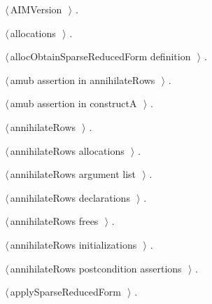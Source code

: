 \documentclass{article}
\begin{document}
{\small\begin{list}{}{\setlength{\itemsep}{-\parsep}\setlength{\itemindent}{-\leftmargin}}
\item $\langle\,$AIMVersion\nobreak\ {\footnotesize {}}$\,\rangle$ {\footnotesize {\NWtxtRefIn} .}
\item $\langle\,$allocations\nobreak\ {\footnotesize {}}$\,\rangle$ {\footnotesize {\NWtxtRefIn} .
}
\item $\langle\,$allocObtainSparseReducedForm definition\nobreak\ {\footnotesize {}}$\,\rangle$ {\footnotesize {\NWtxtRefIn} .}
\item $\langle\,$amub assertion in annihilateRows\nobreak\ {\footnotesize {}}$\,\rangle$ {\footnotesize {\NWtxtRefIn} .}
\item $\langle\,$amub assertion in constructA\nobreak\ {\footnotesize {}}$\,\rangle$ {\footnotesize {\NWtxtRefIn} .}
\item $\langle\,$annihilateRows\nobreak\ {\footnotesize {}}$\,\rangle$ {\footnotesize {\NWtxtRefIn} .}
\item $\langle\,$annihilateRows allocations\nobreak\ {\footnotesize {}}$\,\rangle$ {\footnotesize {\NWtxtRefIn} .}
\item $\langle\,$annihilateRows argument list\nobreak\ {\footnotesize {}}$\,\rangle$ {\footnotesize {\NWtxtRefIn} .}
\item $\langle\,$annihilateRows declarations\nobreak\ {\footnotesize {}}$\,\rangle$ {\footnotesize {\NWtxtRefIn} .}
\item $\langle\,$annihilateRows frees\nobreak\ {\footnotesize {}}$\,\rangle$ {\footnotesize {\NWtxtRefIn} .}
\item $\langle\,$annihilateRows initializations\nobreak\ {\footnotesize {}}$\,\rangle$ {\footnotesize {\NWtxtRefIn} .}
\item $\langle\,$annihilateRows postcondition assertions\nobreak\ {\footnotesize {}}$\,\rangle$ {\footnotesize {\NWtxtRefIn} .}
\item $\langle\,$applySparseReducedForm\nobreak\ {\footnotesize {}}$\,\rangle$ {\footnotesize {\NWtxtRefIn} .}

\end{list}}
\end{document}
